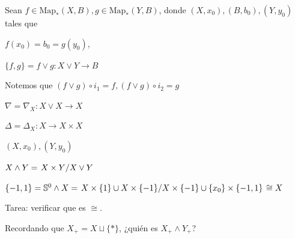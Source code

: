\begin{tcolorbox}
    Sean \(f\in\operatorname{Map_{\ast}}(X, B), g\in\operatorname{Map_{\ast}}(Y, B)\), donde \((X, x_0), (B, b_0), (Y, y_0)\) tales que 
    
    \(f(x_0)=b_0=g(y_0)\),
    \begin{center}
    \(\{f, g\}=f\vee g \colon X\vee Y\to B\)
    \end{center}
    \tcblower
    Notemos que \((f\vee g)\circ i_1 =f, (f\vee g)\circ i_2 =g\)    
\end{tcolorbox}

\begin{tcolorbox}[colback=white!15!white,colframe=red!75!black,title=\textbf{Mapa doblado}\index{mapa doblado}]
    \begin{center}
        \(\nabla=\nabla_{X}\colon X\vee X \to X\)
    \end{center}
\end{tcolorbox}

\begin{tcolorbox}[colback=white!15!white,colframe=red!75!black,title=\textbf{Mapa diagonal}\index{mapa diagonal}]
    \begin{center}
        \(\Delta = \Delta_{X}\colon X\to X\times X\)
    \end{center}
\end{tcolorbox}

\begin{tcolorbox}[colback=white!15!white,colframe=red!75!black,title=\textbf{Producto smash}\index{producto smash}]
    \((X, x_0), (Y, y_0)\)
    \tcblower
    \begin{center}
        \(X\wedge Y=\left.X\times Y\middle/X\vee Y\right.\)
    \end{center}
\end{tcolorbox}

\begin{tcolorbox}[colback=lime!15!white,colframe=green!55!black,title=\textbf{Ejemplo}]
    \begin{center}
        \(\{-1, 1\}=\mathbb{S}^0\wedge X = \left.X\times\{1\}\cup X\times\{-1\}\middle/X\times\{-1\}\cup \{x_0\}\times\{-1, 1\}\right.\cong X\)
    \end{center}\tcblower
    Tarea: verificar que es \(\cong\).
\end{tcolorbox}

\begin{tcolorbox}[colback=white!15!white,colframe=green!55!black,title=\textbf{Ejercicio}]
        Recordando que \(X_{+}=X\sqcup\{\ast\}\), ¿quién es \(X_{+}\wedge Y_{+}\)?
\end{tcolorbox}

